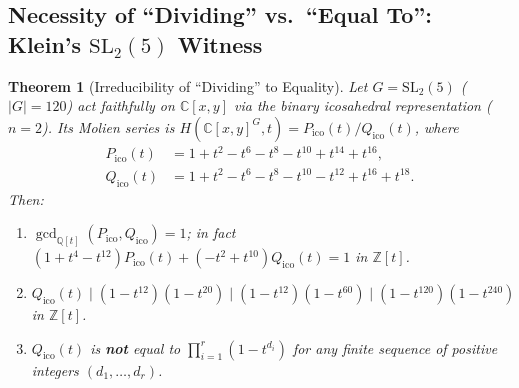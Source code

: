 \documentclass[11pt]{article}
\newtheorem{theorem}{Theorem}[section]
\theoremstyle{definition}
\theoremstyle{remark}
\begin{document}
\subsection{Necessity of ``Dividing'' vs.\ ``Equal To'': Klein's \texorpdfstring{$\mathrm{SL}_2(5)$}{SL2(5)} Witness}

\begin{theorem}[Irreducibility of ``Dividing'' to Equality]
\label{thm:klein}
Let $G = \mathrm{SL}_2(5)$ ($|G| = 120$) act faithfully on $\mathbb{C}[x,y]$ via the binary icosahedral representation ($n = 2$). Its Molien series is $H(\mathbb{C}[x,y]^G, t) = P_{\mathrm{ico}}(t) / Q_{\mathrm{ico}}(t)$, where
\begin{align*}
P_{\mathrm{ico}}(t) &= 1 + t^2 - t^6 - t^8 - t^{10} + t^{14} + t^{16},\\
Q_{\mathrm{ico}}(t) &= 1 + t^2 - t^6 - t^8 - t^{10} - t^{12} + t^{16} + t^{18}.
\end{align*}
Then:
\begin{enumerate}
\item[(a)] $\gcd_{\mathbb{Q}[t]}(P_{\mathrm{ico}}, Q_{\mathrm{ico}}) = 1$; in fact $(1 + t^4 - t^{12}) P_{\mathrm{ico}}(t) + (-t^2 + t^{10}) Q_{\mathrm{ico}}(t) = 1$ in $\mathbb{Z}[t]$.
\item[(b)] $Q_{\mathrm{ico}}(t) \mid (1 - t^{12})(1 - t^{20}) \mid (1 - t^{12})(1 - t^{60}) \mid (1 - t^{120})(1 - t^{240})$ in $\mathbb{Z}[t]$.
\item[(c)] $Q_{\mathrm{ico}}(t)$ is \textbf{not} equal to $\prod_{i=1}^r (1 - t^{d_i})$ for any finite sequence of positive integers $(d_1,\dots,d_r)$.
\end{enumerate}
\end{theorem}
\end{document}
